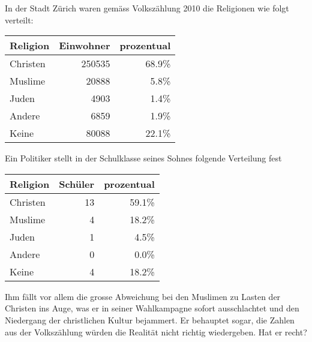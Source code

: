 In der Stadt Zürich waren gemäss Volkszählung 2010 die Religionen
wie folgt verteilt:
\begin{center}
\begin{tabular}{|l|r|r|}
\hline
Religion&Einwohner&prozentual\\
\hline
Christen&   250535&68.9\%\\
Muslime &    20888& 5.8\%\\
Juden   &     4903& 1.4\%\\
Andere  &     6859& 1.9\%\\
Keine   &    80088&22.1\%\\
\hline
\end{tabular}
\end{center}
Ein Politiker stellt in der Schulklasse seines Sohnes folgende
Verteilung fest
\begin{center}
\begin{tabular}{|l|r|r|}
\hline
Religion&Schüler&prozentual\\
\hline
Christen&      13&    59.1\%\\
Muslime &       4&    18.2\%\\
Juden   &       1&     4.5\%\\
Andere  &       0&     0.0\%\\
Keine   &       4&    18.2\%\\
\hline
\end{tabular}
\end{center}
Ihm fällt vor allem die grosse Abweichung bei den Muslimen
zu Lasten der Christen ins Auge, was er in seiner Wahlkampagne
sofort ausschlachtet und den Niedergang der christlichen Kultur
bejammert.
Er behauptet sogar, die Zahlen aus der Volkszählung würden die
Realität nicht richtig wiedergeben. Hat er recht?


